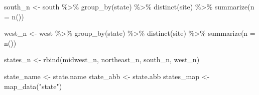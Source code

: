 \documentclass[12pt, twoside]{amherstthesis}
\newenvironment{Shaded}{\begin{snugshade}}{\end{snugshade}}
\newcommand{\AttributeTok}[1]{\textcolor[rgb]{0.77,0.63,0.00}{#1}}
\newcommand{\FunctionTok}[1]{\textcolor[rgb]{0.00,0.00,0.00}{#1}}
\newcommand{\NormalTok}[1]{#1}
\newcommand{\OtherTok}[1]{\textcolor[rgb]{0.56,0.35,0.01}{#1}}
\newcommand{\SpecialCharTok}[1]{\textcolor[rgb]{0.00,0.00,0.00}{#1}}
\newcommand{\StringTok}[1]{\textcolor[rgb]{0.31,0.60,0.02}{#1}}
\begin{document}
\begin{Shaded}
\begin{Highlighting}[]
\NormalTok{south\_n }\OtherTok{\textless{}{-}}\NormalTok{ south }\SpecialCharTok{\%\textgreater{}\%}
  \FunctionTok{group\_by}\NormalTok{(state) }\SpecialCharTok{\%\textgreater{}\%}
  \FunctionTok{distinct}\NormalTok{(site) }\SpecialCharTok{\%\textgreater{}\%}
  \FunctionTok{summarize}\NormalTok{(}\AttributeTok{n =} \FunctionTok{n}\NormalTok{())}

\NormalTok{west\_n }\OtherTok{\textless{}{-}}\NormalTok{ west }\SpecialCharTok{\%\textgreater{}\%}
  \FunctionTok{group\_by}\NormalTok{(state) }\SpecialCharTok{\%\textgreater{}\%}
  \FunctionTok{distinct}\NormalTok{(site) }\SpecialCharTok{\%\textgreater{}\%}
  \FunctionTok{summarize}\NormalTok{(}\AttributeTok{n =} \FunctionTok{n}\NormalTok{())}

\NormalTok{states\_n }\OtherTok{\textless{}{-}} \FunctionTok{rbind}\NormalTok{(midwest\_n, northeast\_n, south\_n, west\_n)}

\NormalTok{state\_name }\OtherTok{\textless{}{-}}\NormalTok{ state.name}
\NormalTok{state\_abb }\OtherTok{\textless{}{-}}\NormalTok{ state.abb}
\NormalTok{states\_map }\OtherTok{\textless{}{-}} \FunctionTok{map\_data}\NormalTok{(}\StringTok{"state"}\NormalTok{)}
\end{Highlighting}
\end{Shaded}
\end{document}
